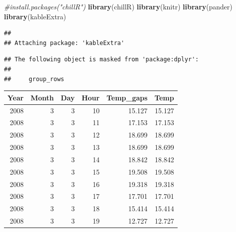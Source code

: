 \documentclass[
]{book}
\newenvironment{Shaded}{\begin{snugshade}}{\end{snugshade}}
\newcommand{\CommentTok}[1]{\textcolor[rgb]{0.56,0.35,0.01}{\textit{#1}}}
\newcommand{\DataTypeTok}[1]{\textcolor[rgb]{0.13,0.29,0.53}{#1}}
\newcommand{\DecValTok}[1]{\textcolor[rgb]{0.00,0.00,0.81}{#1}}
\newcommand{\KeywordTok}[1]{\textcolor[rgb]{0.13,0.29,0.53}{\textbf{#1}}}
\newcommand{\NormalTok}[1]{#1}
\newcommand{\OperatorTok}[1]{\textcolor[rgb]{0.81,0.36,0.00}{\textbf{#1}}}
\newcommand{\StringTok}[1]{\textcolor[rgb]{0.31,0.60,0.02}{#1}}
\begin{document}
\begin{Shaded}
\begin{Highlighting}[]
\CommentTok{#install.packages("chillR")}
\KeywordTok{library}\NormalTok{(chillR)}
\KeywordTok{library}\NormalTok{(knitr)}
\KeywordTok{library}\NormalTok{(pander)}
\KeywordTok{library}\NormalTok{(kableExtra)}
\end{Highlighting}
\end{Shaded}

\begin{verbatim}
## 
## Attaching package: 'kableExtra'
\end{verbatim}

\begin{verbatim}
## The following object is masked from 'package:dplyr':
## 
##     group_rows
\end{verbatim}

\begin{Shaded}
\end{Shaded}

\begingroup\fontsize{10}{12}\selectfont

\begin{tabular}{r|r|r|r|r|r}
\hline
Year & Month & Day & Hour & Temp\_gaps & Temp\\
\hline
2008 & 3 & 3 & 10 & 15.127 & 15.127\\
\hline
2008 & 3 & 3 & 11 & 17.153 & 17.153\\
\hline
2008 & 3 & 3 & 12 & 18.699 & 18.699\\
\hline
2008 & 3 & 3 & 13 & 18.699 & 18.699\\
\hline
2008 & 3 & 3 & 14 & 18.842 & 18.842\\
\hline
2008 & 3 & 3 & 15 & 19.508 & 19.508\\
\hline
2008 & 3 & 3 & 16 & 19.318 & 19.318\\
\hline
2008 & 3 & 3 & 17 & 17.701 & 17.701\\
\hline
2008 & 3 & 3 & 18 & 15.414 & 15.414\\
\hline
2008 & 3 & 3 & 19 & 12.727 & 12.727\\
\hline
\end{tabular}
\endgroup{}
\end{document}
